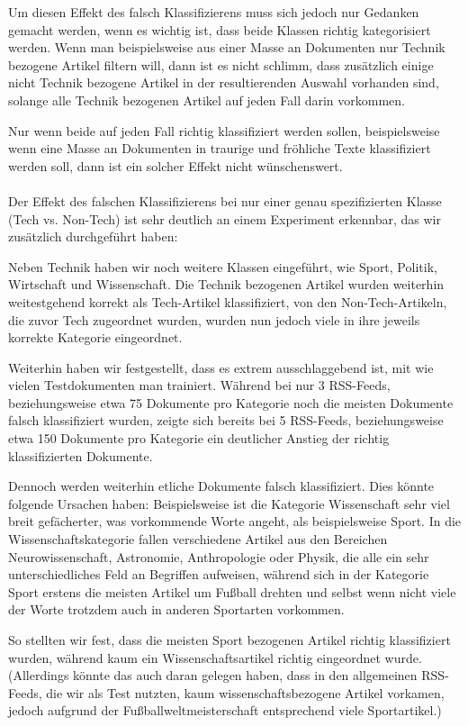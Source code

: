 \documentclass[12pt,a4paper]{scrartcl}
\begin{document}
Um diesen Effekt des falsch Klassifizierens muss sich jedoch nur Gedanken gemacht werden, wenn es wichtig ist, dass beide Klassen richtig kategorisiert werden. Wenn man beispielsweise aus einer Masse an Dokumenten nur Technik bezogene Artikel filtern will, dann ist es nicht schlimm, dass zus\"atzlich einige nicht Technik bezogene Artikel in der resultierenden Auswahl vorhanden sind, solange alle Technik bezogenen Artikel auf jeden Fall darin vorkommen. 

Nur wenn beide auf jeden Fall richtig klassifiziert werden sollen, beispielsweise wenn eine Masse an Dokumenten in traurige und fr\"ohliche Texte klassifiziert werden soll, dann ist ein solcher Effekt nicht w\"unschenswert. 
\\\\
Der Effekt des falschen Klassifizierens bei nur einer genau spezifizierten Klasse (Tech vs. Non-Tech) ist sehr deutlich an einem Experiment erkennbar, das wir zus\"atzlich durchgef\"uhrt haben: 

Neben Technik haben wir noch weitere Klassen eingef\"uhrt, wie Sport, Politik, Wirtschaft und Wissenschaft. Die Technik bezogenen Artikel wurden weiterhin weitestgehend korrekt als Tech-Artikel klassifiziert, von den Non-Tech-Artikeln, die zuvor Tech zugeordnet wurden, wurden nun jedoch viele in ihre jeweils korrekte Kategorie eingeordnet.

Weiterhin haben wir festgestellt, dass es extrem ausschlaggebend ist, mit wie vielen Testdokumenten man trainiert. W\"ahrend bei nur 3 RSS-Feeds, beziehungsweise etwa 75 Dokumente pro Kategorie noch die meisten Dokumente falsch klassifiziert wurden, zeigte sich bereits bei 5 RSS-Feeds, beziehungsweise etwa 150 Dokumente pro Kategorie ein deutlicher Anstieg der richtig klassifizierten Dokumente.

Dennoch werden weiterhin etliche Dokumente falsch klassifiziert. Dies k\"onnte folgende Ursachen haben: Beispielsweise ist die Kategorie Wissenschaft sehr viel breit gef\"acherter, was vorkommende Worte angeht, als beispielsweise Sport. In die Wissenschaftskategorie fallen verschiedene Artikel aus den Bereichen Neurowissenschaft, Astronomie, Anthropologie oder Physik, die alle ein sehr unterschiedliches Feld an Begriffen aufweisen, w\"ahrend sich in der Kategorie Sport erstens die meisten Artikel um Fu\ss ball drehten und selbst wenn nicht viele der Worte trotzdem auch in anderen Sportarten vorkommen. 

So stellten wir fest, dass die meisten Sport bezogenen Artikel richtig klassifiziert wurden, w\"ahrend kaum ein Wissenschaftsartikel richtig eingeordnet wurde. (Allerdings k\"onnte das auch daran gelegen haben, dass in den allgemeinen RSS-Feeds, die wir als Test nutzten, kaum wissenschaftsbezogene Artikel vorkamen, jedoch aufgrund der Fu\ss ballweltmeisterschaft entsprechend viele Sportartikel.)
\end{document}

